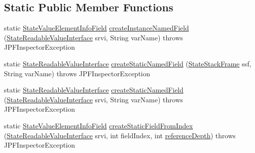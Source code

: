 \subsection*{Static Public Member Functions}
\begin{DoxyCompactItemize}
\item 
static \hyperlink{classgov_1_1nasa_1_1jpf_1_1inspector_1_1server_1_1programstate_1_1_state_value_element_info_field}{State\+Value\+Element\+Info\+Field} \hyperlink{classgov_1_1nasa_1_1jpf_1_1inspector_1_1server_1_1programstate_1_1_state_value_element_info_field_ac0731482f06d5adf849e5d9ed1d055b0}{create\+Instance\+Named\+Field} (\hyperlink{interfacegov_1_1nasa_1_1jpf_1_1inspector_1_1server_1_1programstate_1_1_state_readable_value_interface}{State\+Readable\+Value\+Interface} srvi, String var\+Name)  throws J\+P\+F\+Inspector\+Exception 
\item 
static \hyperlink{interfacegov_1_1nasa_1_1jpf_1_1inspector_1_1server_1_1programstate_1_1_state_readable_value_interface}{State\+Readable\+Value\+Interface} \hyperlink{classgov_1_1nasa_1_1jpf_1_1inspector_1_1server_1_1programstate_1_1_state_value_element_info_field_a52e97b57c2ead1054fd08b47e64e208c}{create\+Static\+Named\+Field} (\hyperlink{classgov_1_1nasa_1_1jpf_1_1inspector_1_1server_1_1programstate_1_1_state_stack_frame}{State\+Stack\+Frame} ssf, String var\+Name)  throws J\+P\+F\+Inspector\+Exception 
\item 
static \hyperlink{interfacegov_1_1nasa_1_1jpf_1_1inspector_1_1server_1_1programstate_1_1_state_readable_value_interface}{State\+Readable\+Value\+Interface} \hyperlink{classgov_1_1nasa_1_1jpf_1_1inspector_1_1server_1_1programstate_1_1_state_value_element_info_field_a92486a5cff0ecb95a801fea5d0959441}{create\+Static\+Named\+Field} (\hyperlink{interfacegov_1_1nasa_1_1jpf_1_1inspector_1_1server_1_1programstate_1_1_state_readable_value_interface}{State\+Readable\+Value\+Interface} srvi, String var\+Name)  throws J\+P\+F\+Inspector\+Exception 
\item 
static \hyperlink{classgov_1_1nasa_1_1jpf_1_1inspector_1_1server_1_1programstate_1_1_state_value_element_info_field}{State\+Value\+Element\+Info\+Field} \hyperlink{classgov_1_1nasa_1_1jpf_1_1inspector_1_1server_1_1programstate_1_1_state_value_element_info_field_ac99325b87909d5182e8b05755ce491e2}{create\+Static\+Field\+From\+Index} (\hyperlink{interfacegov_1_1nasa_1_1jpf_1_1inspector_1_1server_1_1programstate_1_1_state_readable_value_interface}{State\+Readable\+Value\+Interface} srvi, int field\+Index, int \hyperlink{classgov_1_1nasa_1_1jpf_1_1inspector_1_1server_1_1programstate_1_1_state_node_a55683618625dae46e8aa68d95811d6bb}{reference\+Depth})  throws J\+P\+F\+Inspector\+Exception 

\end{DoxyCompactItemize}
